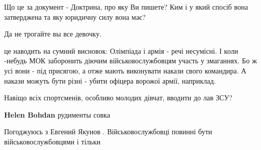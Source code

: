 \begin{itemize}
Що це за документ - Доктрина, про яку Ви пишете? Ким і у який спосіб вона затверджена та яку юридичну силу вона має?

 
Да не трогайте вы все девочку.

 

це наводить на сумний висновок: Олімпіада і армія - речі несумісні. І коли
-небудь МОК заборонить діючим військовослужбовцям участь у змаганнях. Бо ж усі
вони - під присягою, а отже мають виконувати накази свого командира. А накази
можуть бути різні - убити офіцера ворожої армії, наприклад.


 
Навіщо всіх спортсменів, особливо молодих дівчат, вводити до лав ЗСУ?

\begin{itemize}
 
\textbf{Helen Bohdan} рудименты совка
\end{itemize}

 
Погоджуюсь з Евгений Якунов . Військовослужбовці повинні бути військовослужбовцями і тільки

 

\end{itemize}
